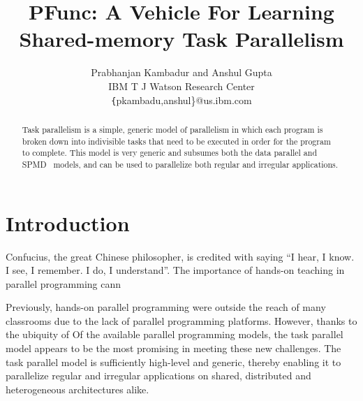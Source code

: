 \documentclass[9pt,twocolumn,letter]{article}
\begin{document}
\title{PFunc: A Vehicle For Learning Shared-memory Task Parallelism}

\author{
Prabhanjan Kambadur and Anshul Gupta\\ 
IBM T J Watson Research Center\\
{\texttt \{pkambadu,anshul\}@us.ibm.com}
}

\date{}

\maketitle


\begin{abstract} 
Task parallelism is a simple, generic model of parallelism in which each 
program is broken down into indivisible tasks that need to be executed in 
order for the program to complete.
%
This model is very generic and subsumes both the data parallel and
SPMD~\cite{darema2001} models, and can be used to parallelize both regular and
irregular applications.
%
\end{abstract}

\section{Introduction}
Confucius, the great Chinese philosopher, is credited with saying ``I hear,
I know. I see, I remember. I do, I understand''.
%
The importance of hands-on teaching in parallel programming cann

%
Previously, hands-on parallel programming were outside the reach of many 
classrooms due to the lack of parallel programming platforms.
% 
However, thanks to the ubiquity of 
Of the available parallel programming models, the task parallel model appears
to be the most promising in meeting these new challenges.  The task parallel
model is sufficiently high-level and generic, thereby enabling it to
parallelize regular and irregular applications on shared, distributed and
heterogeneous architectures alike.  
\end{document}
